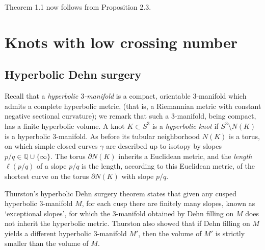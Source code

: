 \documentclass[11pt,usenames,dvipsnames,reqno]{amsart}
\numberwithin{theorem}{section}
\theoremstyle{ex}
\theoremstyle{rem}
\begin{document}
Theorem 1.1 now follows from Proposition 2.3.

\section{Knots with low crossing number}

\subsection{Hyperbolic Dehn surgery} Recall that a \textit{hyperbolic $3$-manifold} is a compact, orientable $3$-manifold which admits a complete hyperbolic metric, (that is, a Riemannian metric with constant negative sectional curvature); we remark that such a $3$-manifold, being compact, has a finite hyperbolic volume. A knot $K\subset S^3$ is a \textit{hyperbolic knot} if $S^3\setminus N(K)$ is a hyperbolic $3$-manifold. As before its tubular neighborhood $N(K)$ is a torus, on which simple closed curves $\gamma$ are described up to isotopy by slopes $p/q\in\mathbb{Q}\cup\{\infty\}$. The torus $\partial N(K)$ inherits a Euclidean metric, and the \textit{length} $\ell(p/q)$ of a slope $p/q$ is the length, according to this Euclidean metric, of the shortest curve on the torus $\partial N(K)$ with slope $p/q$.

Thurston's hyperbolic Dehn surgery theorem \cite[\S5.8]{thurston-notes} states that given any cusped hyperbolic $3$-manifold $M$, for each cusp there are finitely many slopes, known as `exceptional slopes', for which the $3$-manifold obtained by Dehn filling on $M$ does not inherit the hyperbolic metric. Thurston also showed \cite[p.~268]{benedetti-petronio} that if Dehn filling on $M$ yields a different hyperbolic $3$-manifold $M'$, then the volume of $M'$ is strictly smaller than the volume of $M$.
\end{document}
